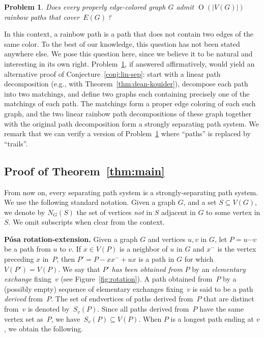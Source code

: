 \documentclass[11pt]{article}
\newcommand{\defi}[1]{\emph{#1}}
\DeclareMathOperator{\bigoh}{\mathrm{O}}
\newtheorem{problem}[theorem]{Problem}
\begin{document}
\begin{problem}\label{prob:rainbow}
Does every properly edge-colored graph \(G\) admit
$\bigoh(|V(G)|)$ rainbow paths that cover~$E(G)$\,?
\end{problem}

In this context, a rainbow path is a path that does not contain two edges of the same color.
To the best of our knowledge, this question has not been stated anywhere else.
  We pose this question here, since we believe it to be natural and interesting in its own right.
Problem~\ref{prob:rainbow}, if answered affirmatively, would yield an alternative proof of Conjecture~\ref{conj:lin-sep}:
start with a linear path decomposition (e.g., with Theorem~\ref{thm:dean-kouider}),
decompose each path into two matchings, and define two graphs each containing precisely one of the matchings of each path.
The matchings form a proper edge coloring of each such graph,
and the two linear rainbow path decompositions of these graph together with the original path decomposition form a strongly separating path system.  We remark that we can verify a version of Problem~\ref{prob:rainbow}  where ``paths'' is replaced by ``trails''.




\subsection*{Proof of Theorem~\ref{thm:main}}

From now on, every separating path system is a strongly-separating path system.
We use the following standard notation.
Given a graph \(G\), and  a set \(S\subseteq V(G)\),
we denote by \(N_G(S)\) the set of vertices \emph{not} in $S$ adjacent in \(G\) to some vertex in \(S\).
We omit subscripts when clear from the context.



\medskip
\noindent\textbf{Pósa rotation-extension.}
Given a graph $G$ and vertices $u, v$ in \(G\), let \(P = u \cdots v\) be a path from $u$ to $v$.
If \(x\in V(P)\) is a neighbor of \(u\) in \(G\)
and \(x^-\) is the vertex preceding \(x\) in~\(P\),
then \(P' = P-xx^- + ux\) is a path in \(G\) for which \(V(P') = V(P)\).
We say that \(P'\) \defi{has been obtained from} \(P\) by an
\defi{elementary exchange} fixing~\(v\) (see Figure~\ref{fig:rotation}).
A path obtained from~\(P\) by a (possibly empty) sequence of elementary exchanges fixing~\(v\)
is said to be a path \defi{derived} from~\(P\).
The set of endvertices of paths derived from~\(P\) that are distinct from~\(v\) is denoted by~\(S_v(P)\).
Since all paths derived from~\(P\) have the same vertex set as~\(P\), we have~\(S_v(P) \subseteq V(P)\).
When \(P\) is a longest path ending at \(v\), we obtain the following.
\end{document}
